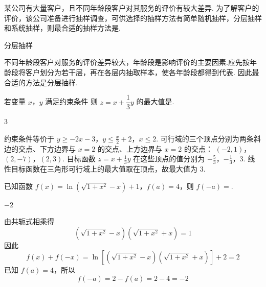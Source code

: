 \begin{problem}
某公司有大量客户，且不同年龄段客户对其服务的评价有较大差异. 为了解客户的评价，该公司准备进行抽样调查，可供选择的抽样方法有简单随机抽样，分层抽样和系统抽样，则最合适的抽样方法是\fillinblank{}.
\end{problem}

\begin{answer}
分层抽样
\end{answer}

\begin{solution}
不同年龄段客户对服务的评价差异较大，年龄段是影响评价的主要因素.应先按年龄段将客户划分为若干层，再在各层内抽取样本，使各年龄段都得到代表. 因此最合适的方法是分层抽样.
\end{solution}

\begin{problem}
若变量 \(x\)，\(y\) 满足约束条件
则 \(z=x+\dfrac13y\) 的最大值是\fillinblank{}.
\end{problem}

\begin{answer}
\(3\)
\end{answer}

\begin{solution}
约束条件等价于
\(y\ge-2x-3\)，\(y\le\frac{x}{2}+2\)，\(x\le2\).
可行域的三个顶点分别为两条斜边的交点、下方边界与 \(x=2\) 的交点、上方边界与 \(x=2\) 的交点：
\((-2,1)\)，\((2,-7)\)，\((2,3)\).
目标函数 \(z=x+\frac13y\) 在这些顶点的值分别为
\(-\frac53\)，\(-\frac13\)，\(3\).
线性目标函数在三角形可行域上的最大值取在顶点，故最大值为 \(3\).
\end{solution}

\begin{problem}
已知函数 \(f(x)=\ln\!\left(\sqrt{1+x^2}-x\right)+1\)，\(f(a)=4\)，则 \(f(-a)=\)\fillinblank{}.
\end{problem}

\begin{answer}
\(-2\)
\end{answer}

\begin{solution}
由共轭式相乘得
\[
\left(\sqrt{1+x^2}-x\right)\left(\sqrt{1+x^2}+x\right)=1
\]
因此
\[
f(x)+f(-x)
=\ln\left[\left(\sqrt{1+x^2}-x\right)\left(\sqrt{1+x^2}+x\right)\right]+2
=2
\]
已知 \(f(a)=4\)，所以
\[
f(-a)=2-f(a)=2-4=-2
\]
\end{solution}

